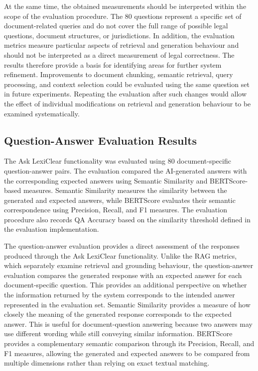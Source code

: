 \documentclass[12pt,a4paper,oneside]{report}
\begin{document}
At the same time, the obtained measurements should be interpreted within the scope of the evaluation procedure. The 80 questions represent a specific set of document-related queries and do not cover the full range of possible legal questions, document structures, or jurisdictions. In addition, the evaluation metrics measure particular aspects of retrieval and generation behaviour and should not be interpreted as a direct measurement of legal correctness. The results therefore provide a basis for identifying areas for further system refinement. Improvements to document chunking, semantic retrieval, query processing, and context selection could be evaluated using the same question set in future experiments. Repeating the evaluation after such changes would allow the effect of individual modifications on retrieval and generation behaviour to be examined systematically.

\subsection{Question-Answer Evaluation Results}

The Ask LexiClear functionality was evaluated using 80 document-specific question-answer pairs. The evaluation compared the AI-generated answers with the corresponding expected answers using Semantic Similarity and BERTScore-based measures. Semantic Similarity measures the similarity between the generated and expected answers, while BERTScore evaluates their semantic correspondence using Precision, Recall, and F1 measures. The evaluation procedure also records QA Accuracy based on the similarity threshold defined in the evaluation implementation.

The question-answer evaluation provides a direct assessment of the responses produced through the Ask LexiClear functionality. Unlike the RAG metrics, which separately examine retrieval and grounding behaviour, the question-answer evaluation compares the generated response with an expected answer for each document-specific question. This provides an additional perspective on whether the information returned by the system corresponds to the intended answer represented in the evaluation set. Semantic Similarity provides a measure of how closely the meaning of the generated response corresponds to the expected answer. This is useful for document-question answering because two answers may use different wording while still conveying similar information. BERTScore provides a complementary semantic comparison through its Precision, Recall, and F1 measures, allowing the generated and expected answers to be compared from multiple dimensions rather than relying on exact textual matching.
\end{document}
